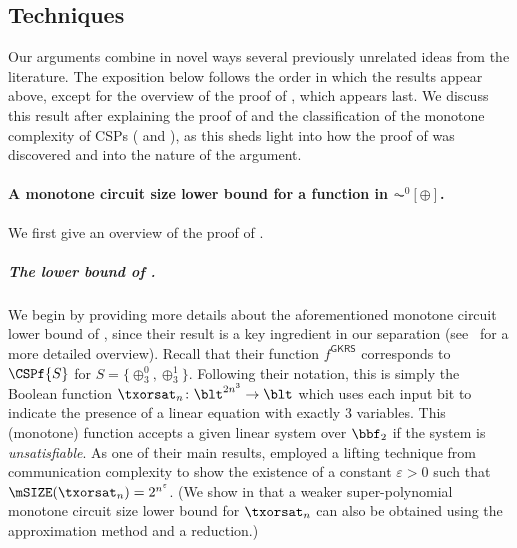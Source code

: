 \documentclass[11pt]{article}
\begin{document}
 





    













\subsection{Techniques}
\label{sec:techniques}

Our arguments combine in novel ways several previously unrelated ideas from the literature. The exposition below follows the order in which the results appear above,
except for the overview of the proof of ,
which appears last. We discuss this result after explaining the proof of
 and the classification of the monotone complexity
of CSPs ( and ), as
this sheds light into how the proof of  was
discovered and into the nature of the argument.



\paragraph{A monotone circuit size lower bound for a function in
$\AC^0[\oplus]$.}

We first give an overview of the proof of .

\subparagraph{The lower bound of \emph{\cite{gkrs19}}.}

We begin by providing more details about the aforementioned monotone circuit lower bound of \cite{gkrs19}, since their result is a key ingredient in our separation (see~\cite{DBLP:journals/sigact/RezendeGR22}
for a more detailed overview). Recall that their function $f^{\mathsf{GKRS}}$ corresponds to $\CSPf{S}$ for $S = \{\oplus^0_3, \oplus^1_3\}$. Following their notation, this is simply the  Boolean function $\txorsat_n \colon \blt^{2n^3} \to \blt$ which uses each input bit to indicate the presence of a linear equation with exactly $3$ variables. This (monotone) function accepts a given linear system over $\bbf_2$
if the system is \emph{unsatisfiable}. As one of their main results, \cite{gkrs19} employed a lifting technique from communication complexity to show the existence of a constant $\varepsilon > 0$ such that $\mSIZE(\txorsat_n) = 2^{n^{\varepsilon}}$. (We show in  that a weaker super-polynomial monotone circuit size lower bound for $\txorsat_n$ can also be obtained using the approximation method and a reduction.)\\
\end{document}
